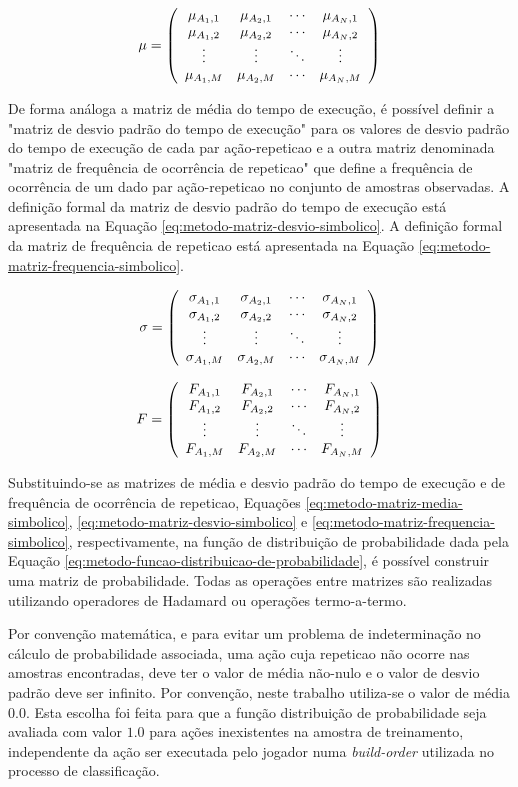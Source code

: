 \begin{equation}
	\mu =  \left(\begin{array}{cccc} {\mu}_{A_1,1} & {\mu}_{A_2,1} & \cdots & {\mu}_{A_N,1} \\ {\mu}_{A_1,2} & {\mu}_{A_2,2} & \cdots & {\mu}_{A_N,2} \\ \vdots & \vdots & \ddots & \vdots \\ {\mu}_{A_1,M} & {\mu}_{A_2,M} & \cdots & {\mu}_{A_N,M} \end{array}\right) 
	\label{eq:metodo-matriz-media-simbolico}
\end{equation}

De forma análoga a matriz de média do tempo de execução, é possível definir a "matriz de desvio padrão do tempo de execução" para os valores de desvio padrão do tempo de execução de cada par ação-\gls{repeticao} e a outra matriz denominada "matriz de frequência de ocorrência de \gls{repeticao}" que define a frequência de ocorrência de um dado par ação-\gls{repeticao} no conjunto de amostras observadas. A definição formal da matriz de desvio padrão do tempo de execução está apresentada na Equação \ref{eq:metodo-matriz-desvio-simbolico}. A definição formal da matriz de frequência de \gls{repeticao} está apresentada na Equação \ref{eq:metodo-matriz-frequencia-simbolico}.

\begin{equation}
	\sigma =  \left(\begin{array}{cccc} {\sigma}_{A_1,1} & {\sigma}_{A_2,1} & \cdots & {\sigma}_{A_N,1} \\ {\sigma}_{A_1,2} & {\sigma}_{A_2,2} & \cdots & {\sigma}_{A_N,2} \\ \vdots & \vdots & \ddots & \vdots \\ {\sigma}_{A_1,M} & {\sigma}_{A_2,M} & \cdots & {\sigma}_{A_N,M} \end{array}\right) 
	\label{eq:metodo-matriz-desvio-simbolico}
\end{equation}

\begin{equation}
	F =  \left(\begin{array}{cccc} {F}_{A_1,1} & {F}_{A_2,1} & \cdots & {F}_{A_N,1} \\ {F}_{A_1,2} & {F}_{A_2,2} & \cdots & {F}_{A_N,2} \\ \vdots & \vdots & \ddots & \vdots \\ {F}_{A_1,M} & {F}_{A_2,M} & \cdots & {F}_{A_N,M} \end{array}\right) 
	\label{eq:metodo-matriz-frequencia-simbolico}
\end{equation}


Substituindo-se as matrizes de média e desvio padrão do tempo de execução e de frequência de ocorrência de \gls{repeticao}, Equações \ref{eq:metodo-matriz-media-simbolico}, \ref{eq:metodo-matriz-desvio-simbolico} e \ref{eq:metodo-matriz-frequencia-simbolico}, respectivamente, na função de distribuição de probabilidade dada pela Equação \ref{eq:metodo-funcao-distribuicao-de-probabilidade}, é possível construir uma matriz de probabilidade. Todas as operações entre matrizes são realizadas utilizando operadores de Hadamard \cite{matrix-analysis} ou operações termo-a-termo.

Por convenção matemática, e para evitar um problema de indeterminação no cálculo de probabilidade associada, uma ação cuja \gls{repeticao} não ocorre nas amostras encontradas, deve ter o valor de média não-nulo e o valor de desvio padrão deve ser infinito. Por convenção, neste trabalho utiliza-se o valor de média $0.0$. Esta escolha foi feita para que a função distribuição de probabilidade seja avaliada com valor $1.0$ para ações inexistentes na amostra de treinamento, independente da ação ser executada pelo jogador numa \textit{\gls{build-order}} utilizada no processo de classificação.

